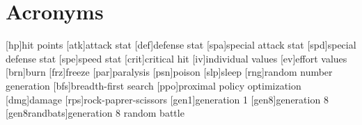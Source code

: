 
\chapter*{Acronyms}

\begin{acronym}
	[hp]{hit points}
	[atk]{attack stat}
	[def]{defense stat}
	[spa]{special attack stat}
	[spd]{special defense stat}
	[spe]{speed stat}
	[crit]{critical hit}
	[iv]{individual values}
	[ev]{effort values}
	[brn]{burn}
	[frz]{freeze}
	[par]{paralysis}
	[psn]{poison}
	[slp]{sleep}
	[rng]{random number generation}
	[bfs]{breadth-first search}
	[ppo]{proximal policy optimization}
	[dmg]{damage}
	[rps]{rock-paprer-scissors}
	[gen1]{generation 1}
	[gen8]{generation 8}
	[gen8randbats]{generation 8 random battle}
\end{acronym}